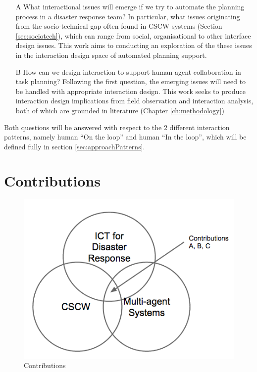 \begin{enumerate}
\item[A] What interactional issues will emerge if we try to automate the planning process in a disaster response team? In particular, what issues originating from the socio-technical gap often found in \ac{CSCW} systems (Section \ref{sec:sociotech}), which can range from social, organisational to other interface design issues. This work aims to conducting an exploration of the these issues in the interaction design space of automated planning support.

\item[B] How can we design interaction to support human agent collaboration in task planning?
Following the first question, the emerging issues will need to be handled with appropriate interaction design. This work seeks to produce interaction design implications from field observation and interaction analysis, both of which are grounded in literature (Chapter \ref{ch:methodology})
\end{enumerate}

Both questions will be answered with respect to the 2 different interaction patterns, namely human ``On the loop'' and human ``In the loop'', which will be defined fully in section \ref{sec:approachPatterns}. 

\section{Contributions} 
\begin{figure}[h]
  \centering
  \includegraphics[scale=0.5]{img/introduction/contributions.png}
  \caption{Contributions}
  \label{fig:contributions}
\end{figure}


